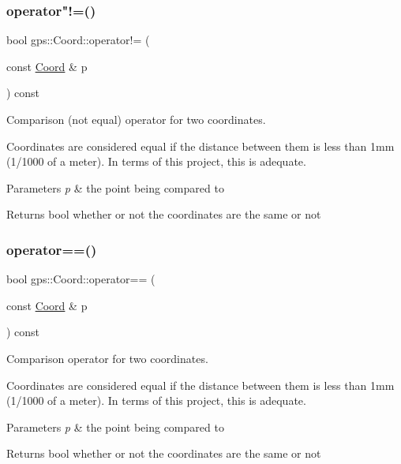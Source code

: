 \subsubsection{\texorpdfstring{operator"!=()}{operator!=()}}
{\footnotesize\ttfamily bool gps\+::\+Coord\+::operator!= (\begin{DoxyParamCaption}\item[{const \hyperlink{classgps_1_1Coord}{Coord} \&}]{p }\end{DoxyParamCaption}) const}

Comparison (not equal) operator for two coordinates.

Coordinates are considered equal if the distance between them is less than 1mm (1/1000 of a meter). In terms of this project, this is adequate.


\begin{DoxyParams}{Parameters}
{\em p} & the point being compared to \\
\hline
\end{DoxyParams}
\begin{DoxyReturn}{Returns}
bool whether or not the coordinates are the same or not 
\end{DoxyReturn}
\mbox{\label{classgps_1_1Coord_a254245e5cdfbac96a1c6e0332f2d65fb}} 
\subsubsection{\texorpdfstring{operator==()}{operator==()}}
{\footnotesize\ttfamily bool gps\+::\+Coord\+::operator== (\begin{DoxyParamCaption}\item[{const \hyperlink{classgps_1_1Coord}{Coord} \&}]{p }\end{DoxyParamCaption}) const}

Comparison operator for two coordinates.

Coordinates are considered equal if the distance between them is less than 1mm (1/1000 of a meter). In terms of this project, this is adequate.


\begin{DoxyParams}{Parameters}
{\em p} & the point being compared to \\
\hline
\end{DoxyParams}
\begin{DoxyReturn}{Returns}
bool whether or not the coordinates are the same or not 
\end{DoxyReturn}
\mbox{\label{classgps_1_1Coord_ac2e47c5d6d9a3d54a4086e8003fc7e9a}} 
